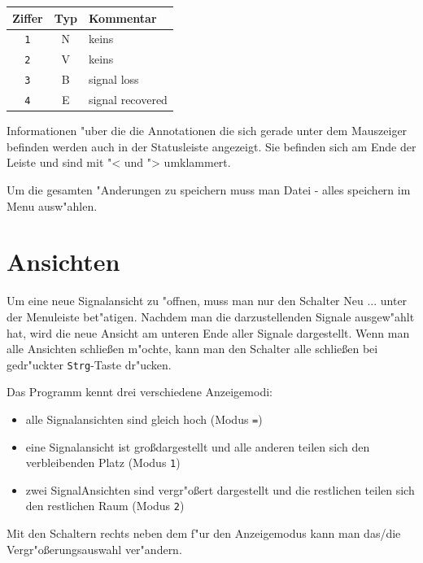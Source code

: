 \noindent
\begin{tabular}{c|c|l}
	\textbf{Ziffer} & \textbf{Typ} & \textbf{Kommentar} \\ \hline
	\verb|1| & N & keins \\
	\verb|2| & V & keins \\
	\verb|3| & B & signal loss\\
	\verb|4| & E & signal recovered\\
\end{tabular}

Informationen "uber die die Annotationen die sich gerade unter dem Mauszeiger befinden werden auch in der Statusleiste angezeigt.
Sie befinden sich am Ende der Leiste und sind mit "< und "> umklammert.

Um die gesamten "Anderungen zu speichern muss man \textsf{Datei - alles speichern} im Menu ausw"ahlen.

\section{Ansichten}

Um eine neue Signalansicht zu "offnen, muss man nur den Schalter \textsf{Neu ...} unter der Menuleiste bet"atigen.
Nachdem man die darzustellenden Signale ausgew"ahlt hat, wird die neue Ansicht am unteren Ende aller Signale dargestellt.
Wenn man alle Ansichten schlie\ss en m"ochte, kann man den Schalter \textsf{alle schlie\ss en} bei gedr"uckter \verb|Strg|-Taste dr"ucken.

Das Programm kennt drei verschiedene Anzeigemodi:
\begin{itemize}
	\item alle Signalansichten sind gleich hoch (Modus \verb|=|)
	\item eine Signalansicht ist gro\ss dargestellt und alle anderen teilen sich den verbleibenden Platz (Modus \verb|1|)
	\item zwei SignalAnsichten sind vergr"o\ss ert dargestellt und die restlichen teilen sich den restlichen Raum (Modus \verb|2|)
\end{itemize}
Mit den Schaltern rechts neben dem f"ur den Anzeigemodus kann man das/die Vergr"o\ss erungsauswahl ver"andern.
